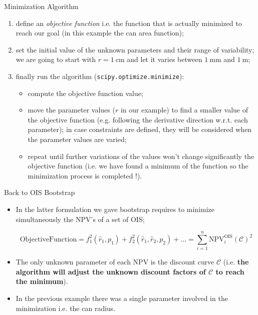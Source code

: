 \documentclass{beamer}
\begin{document}
\begin{frame}{Minimization Algorithm}
 \begin{enumerate}
  \item define an \emph{objective function} i.e. the function that is actually minimized to reach our goal (in this example the can area function);
  \item  set the initial value of the unknown parameters and their range of variability; we are going to start with $r=1~\mathrm{cm}$ and let it varies between $1~\textrm{mm}$ and $1~\textrm{m}$;
  \item finally run the algorithm (\texttt{scipy.optimize.minimize}):
  \begin{itemize}
     \item compute the objective function value;
     \item move the parameter values ($r$ in our example) to find a smaller value of the objective function (e.g. following the derivative direction w.r.t. each parameter); in case constraints are defined, they will be considered when the parameter values are varied;
     \item repeat until further variations of the values won’t change significantly the objective function (i.e. we have found a minimum of the function so the minimization process is completed !).
    \end{itemize}
\end{enumerate}
\end{frame}

\begin{frame}{Back to OIS Bootstrap}
\begin{itemize} 
 \item In the latter formulation we gave bootstrap requires to minimize simultaneously the NPV's of a set of OIS;
 
 \begin{equation}
 \mathrm{Objective Function} =	f_1^2(\hat{r}_1,p_1) + f_2^2(\hat{r}_1, \hat{r}_2,p_2) + \ldots =\sum_{i=1}^{n}\mathrm{NPV}^\mathrm{OIS}_i(\mathcal{C})^2
 \end{equation}
 
 \item  The only unknown parameter of each NPV is the discount curve $\mathcal{C}$ (i.e. \textbf{the algorithm will adjust the unknown discount factors of $\mathcal{C}$ to reach the minimum}).
 \item In the previous example there was a single parameter involved in the minimization i.e. the can radius.
\end{itemize}
\end{frame}
\end{document}
